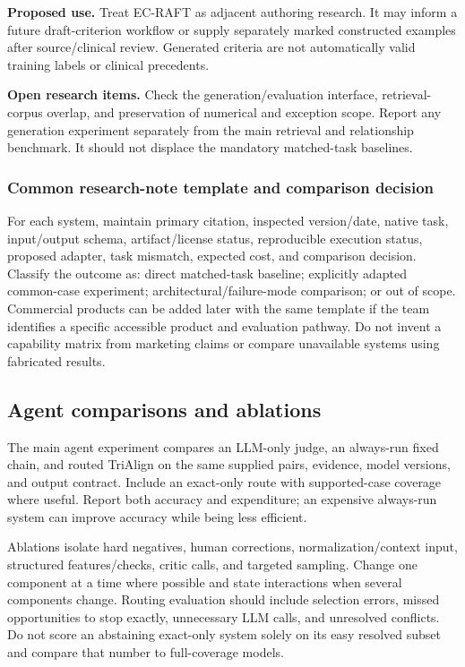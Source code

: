 \documentclass[10pt,letterpaper]{article}
\begin{document}
\textbf{Proposed use.} Treat EC-RAFT as adjacent authoring research. It may
inform a future draft-criterion workflow or supply separately marked
constructed examples after source/clinical review. Generated criteria are
not automatically valid training labels or clinical precedents.

\textbf{Open research items.} Check the generation/evaluation interface,
retrieval-corpus overlap, and preservation of numerical and exception scope.
Report any generation experiment separately from the main retrieval and
relationship benchmark. It should not displace the mandatory matched-task
baselines.

\subsubsection{Common research-note template and comparison decision}
For each system, maintain primary citation, inspected version/date, native
task, input/output schema, artifact/license status, reproducible execution
status, proposed adapter, task mismatch, expected cost, and comparison
decision. Classify the outcome as: direct matched-task baseline; explicitly
adapted common-case experiment; architectural/failure-mode comparison; or
out of scope. Commercial products can be added later with the same template
if the team identifies a specific accessible product and evaluation pathway.
Do not invent a capability matrix from marketing claims or compare unavailable
systems using fabricated results.

\subsection{Agent comparisons and ablations}
The main agent experiment compares an LLM-only judge, an always-run fixed
chain, and routed TriAlign on the same supplied pairs, evidence, model
versions, and output contract. Include an exact-only route with supported-case
coverage where useful. Report both accuracy and expenditure; an expensive
always-run system can improve accuracy while being less efficient.

Ablations isolate hard negatives, human corrections, normalization/context
input, structured features/checks, critic calls, and targeted sampling.
Change one component at a time where possible and state interactions when
several components change. Routing evaluation should include selection errors,
missed opportunities to stop exactly, unnecessary LLM calls, and unresolved
conflicts. Do not score an abstaining exact-only system solely on its easy
resolved subset and compare that number to full-coverage models.
\end{document}
